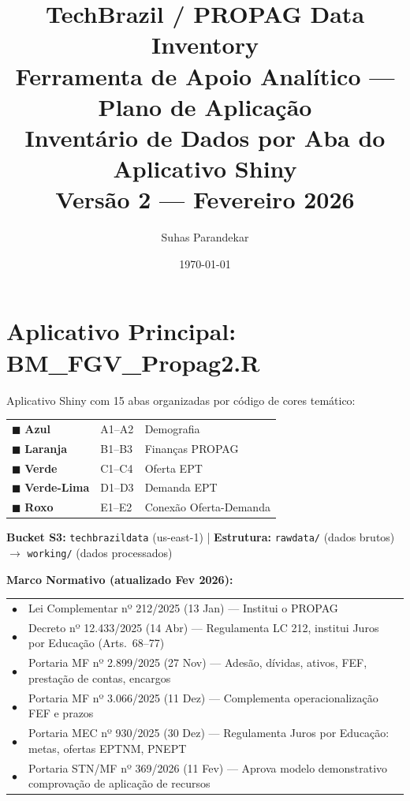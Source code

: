\documentclass[10pt]{article}
\title{\textbf{TechBrazil / PROPAG Data Inventory}\\[0.3em]\large Ferramenta de Apoio Analítico --- Plano de Aplicação\\[0.3em]\normalsize Inventário de Dados por Aba do Aplicativo Shiny\\[0.2em]\small Versão 2 --- Fevereiro 2026}
\author{Suhas Parandekar}
\date{\today}
\begin{document}
	\maketitle
	\thispagestyle{fancy}
	
	\section*{Aplicativo Principal: BM\_FGV\_Propag2.R}
	
	Aplicativo Shiny com 15 abas organizadas por código de cores temático:
	
	\begin{tabular}{lll}
		\textcolor{tabA}{$\blacksquare$} \textbf{Azul} & A1--A2 & Demografia \\
		\textcolor{tabB}{$\blacksquare$} \textbf{Laranja} & B1--B3 & Finanças PROPAG \\
		\textcolor{tabC}{$\blacksquare$} \textbf{Verde} & C1--C4 & Oferta EPT \\
		\textcolor{tabD}{$\blacksquare$} \textbf{Verde-Lima} & D1--D3 & Demanda EPT \\
		\textcolor{tabE}{$\blacksquare$} \textbf{Roxo} & E1--E2 & Conexão Oferta-Demanda \\
	\end{tabular}
	
	\vspace{0.5em}
	\noindent\textbf{Bucket S3:} \texttt{techbrazildata} (us-east-1) | \textbf{Estrutura:} \texttt{rawdata/} (dados brutos) $\rightarrow$ \texttt{working/} (dados processados)
	
	\vspace{0.5em}
	\noindent\textbf{Marco Normativo (atualizado Fev 2026):}
	
	\begin{tabular}{lp{18cm}}
		\textcolor{normgray}{$\bullet$} & Lei Complementar nº 212/2025 (13 Jan) --- Institui o PROPAG \\
		\textcolor{normgray}{$\bullet$} & Decreto nº 12.433/2025 (14 Abr) --- Regulamenta LC 212, institui Juros por Educação (Arts.\ 68--77) \\
		\textcolor{normgray}{$\bullet$} & Portaria MF nº 2.899/2025 (27 Nov) --- Adesão, dívidas, ativos, FEF, prestação de contas, encargos \\
		\textcolor{normgray}{$\bullet$} & Portaria MF nº 3.066/2025 (11 Dez) --- Complementa operacionalização FEF e prazos \\
		\textcolor{normgray}{$\bullet$} & Portaria MEC nº 930/2025 (30 Dez) --- Regulamenta Juros por Educação: metas, ofertas EPTNM, PNEPT \\
		\textcolor{normgray}{$\bullet$} & Portaria STN/MF nº 369/2026 (11 Fev) --- Aprova modelo demonstrativo comprovação de aplicação de recursos \\
	\end{tabular}
	
\end{document}

